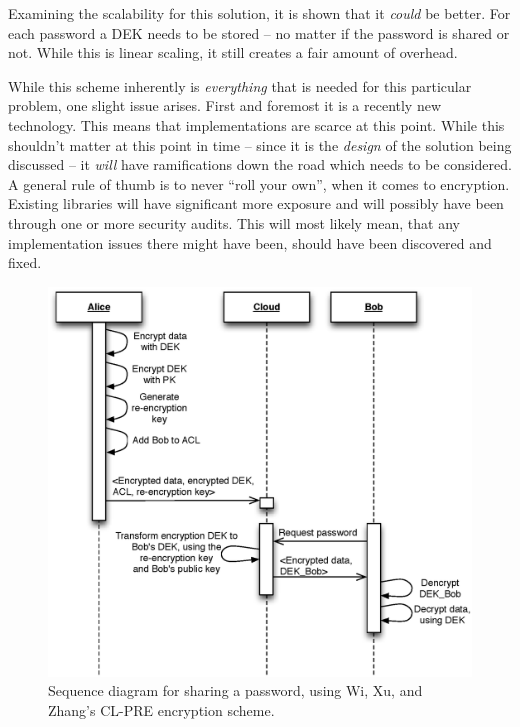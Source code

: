 				Examining the scalability for this solution, it is shown that it \emph{could} be better. For each password a DEK needs to be stored -- no matter if the password is shared or not. While this is linear scaling, it still creates a fair amount of overhead.

				While this scheme inherently is \emph{everything} that is needed for this particular problem, one slight issue arises. First and foremost it is a recently new technology. This means that implementations are scarce at this point. While this shouldn't matter at this point in time -- since it is the \emph{design} of the solution being discussed -- it \emph{will} have ramifications down the road which needs to be considered. A general rule of thumb is to never ``roll your own'', when it comes to encryption. Existing libraries will have significant more exposure and will possibly have been through one or more security audits. This will most likely mean, that any implementation issues there might have been, should have been discovered and fixed.

				\begin{figure}[h!]
					\centering
					\includegraphics[width=\textwidth]{figures/design/uml/sequence/cl-pre.eps}
					\caption{Sequence diagram for sharing a password, using Wi, Xu, and Zhang's CL-PRE encryption scheme\cite{Wu:2011:PCP:2046707.2093514}.}
					\label{fig:sequence:cl-pre}
				\end{figure}

